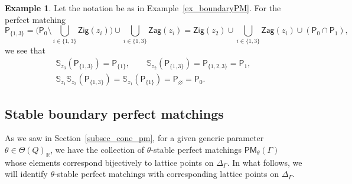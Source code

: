 \documentclass[10pt,a4paper]{amsart}
\numberwithin{equation}{section}
\theoremstyle{definition}
\newtheorem{Example}[Theorem]{Example}
\newcommand{\RR}{\mathbb{R}}
\newcommand{\BS}{\mathbb{S}}
\newcommand{\sfP}{\mathsf{P}}
\newcommand{\Zig}{\mathsf{Zig}}
\newcommand{\Zag}{\mathsf{Zag}}
\newcommand{\PM}{\mathsf{PM}}
\begin{document}
\begin{Example}
Let the notation be as in Example~\ref{ex_boundaryPM}.
For the perfect matching
\[
\sfP_{\{1,3\}}=\biggl(\sfP_0{\setminus}\bigcup_{i\in \{1,3\}}\Zig(z_i)\biggr)\cup\bigcup_{i\in \{1,3\}}\Zag(z_i)
=\Zig(z_2)\cup\bigcup_{i\in \{1,3\}}\Zag(z_i)\cup (\sfP_0\cap\sfP_1 ),
\]
we see that
\begin{gather*}
\BS_{z_3}(\sfP_{\{1,3\}})=\sfP_{\{1\}}, \qquad \BS_{z_2}(\sfP_{\{1,3\}})=\sfP_{\{1,2,3\}}=\sfP_1, \\
\BS_{z_1}\BS_{z_3}(\sfP_{\{1,3\}})=\BS_{z_1}(\sfP_{\{1\}})=\sfP_{\varnothing}=\sfP_0.
\end{gather*}
\end{Example}

\subsection{Stable boundary perfect matchings}

As we saw in Section~\ref{subsec_cone_pm}, for a given generic parameter $\theta\in\Theta(Q)_\RR$,
we have the collection of $\theta$-stable perfect matchings $\PM_\theta(\Gamma)$ whose elements correspond bijectively to lattice points on $\Delta_\Gamma$.
In what follows, we will identify $\theta$-stable perfect matchings with corresponding lattice points on $\Delta_\Gamma$.
\end{document}
